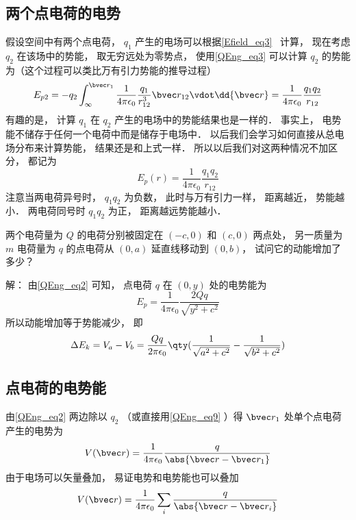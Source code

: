 \subsection{两个点电荷的电势}
假设空间中有两个点电荷， $q_1$ 产生的电场可以根据\autoref{Efield_eq3}~ 计算， 现在考虑 $q_2$ 在该场中的势能， 取无穷远处为零势点， 使用\autoref{QEng_eq3} 可以计算 $q_2$ 的势能为（这个过程可以类比万有引力势能的推导过程）
\begin{equation}
E_{p2} = -q_2 \int_{\infty}^{\bvec r_1} \frac{1}{4\pi\epsilon_0} \frac{q_1}{r_{12}^3}\bvec r_{12} \vdot \dd{\bvec r}
= \frac{1}{4\pi\epsilon_0} \frac{q_1 q_2}{r_{12}}
\end{equation}
有趣的是， 计算 $q_1$ 在 $q_2$ 产生的电场中的势能结果也是一样的． 事实上， 电势能不储存于任何一个电荷中而是储存于电场中． 以后我们会学习如何直接从总电场分布来计算势能， 结果还是和上式一样． %
所以以后我们对这两种情况不加区分， 都记为
\begin{equation}\label{QEng_eq2}
E_p(r) = \frac{1}{4\pi\epsilon_0} \frac{q_1 q_2}{r_{12}}
\end{equation}
注意当两电荷异号时， $q_1 q_2$ 为负数， 此时与万有引力一样， 距离越近， 势能越小． 两电荷同号时 $q_1 q_2$ 为正， 距离越远势能越小．

\begin{example}{}
两个电荷量为 $Q$ 的电荷分别被固定在 $(-c, 0)$ 和 $(c, 0)$ 两点处， 另一质量为 $m$ 电荷量为 $q$ 的点电荷从 $(0, a)$ 延直线移动到 $(0, b)$， 试问它的动能增加了多少？

解： 由\autoref{QEng_eq2} 可知， 点电荷 $q$ 在 $(0, y)$ 处的电势能为
\begin{equation}
E_p = \frac{1}{4\pi\epsilon_0}\frac{2Qq}{\sqrt{y^2 + c^2}}
\end{equation}
所以动能增加等于势能减少， 即
\begin{equation}
\Delta E_k = V_a - V_b = \frac{Qq}{2\pi\epsilon_0}  \qty(\frac{1}{\sqrt{a^2 + c^2}} - \frac{1}{\sqrt{b^2 + c^2}})
\end{equation}
\end{example}

\subsection{点电荷的电势能}
由\autoref{QEng_eq2} 两边除以 $q_2$ （或直接用\autoref{QEng_eq9} ）得 $\bvec r_1$ 处单个点电荷产生的电势为
\begin{equation}
V(\bvec r) = \frac{1}{4\pi\epsilon_0} \frac{q}{\abs{\bvec r - \bvec r_1}}
\end{equation}
由于电场可以矢量叠加， 易证电势和电势能也可以叠加
\begin{equation}
V(\bvec r) = \frac{1}{4\pi\epsilon_0} \sum_i \frac{q}{\abs{\bvec r - \bvec r_i}}
\end{equation}

